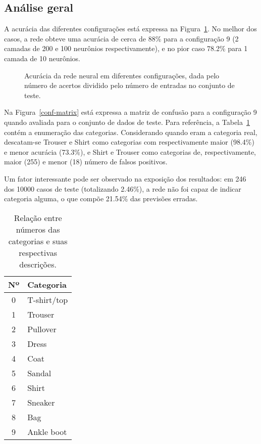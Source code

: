 \documentclass[twocolumn]{article}
\begin{document}
    \subsection{Análise geral}

    A acurácia das diferentes configurações está expressa na
    Figura~\ref{accuracy}. No melhor dos casos, a rede obteve uma acurácia de
    cerca de 88\% para a configuração 9 (2 camadas de 200 e 100 neurônios
    respectivamente), e no pior caso 78.2\% para 1 camada de 10 neurônios.

    \begin{figure}[ht]
        \centering{}
        \def\svgwidth{\columnwidth}
        
        \caption{%
            Acurácia da rede neural em diferentes configurações, dada pelo
            número de acertos dividido pelo número de entradas no conjunto de
            teste.\label{accuracy}
        }
    \end{figure}

    Na Figura~\ref{conf-matrix} está expressa a matriz de confusão para a
    configuração 9 quando avaliada para o conjunto de dados de teste. Para
    referência, a Tabela~\ref{label-nums} contém a enumeração das categorias.
    Considerando quando eram a categoria real, descatam-se Trouser e Shirt como
    categorias com respectivamente maior (98.4\%) e menor acurácia (73.3\%), e
    Shirt e Trouser como categorias de, respectivamente, maior (255) e menor
    (18) número de falsos positivos.

    Um fator interessante pode ser observado na exposição dos resultados: em
    246 dos 10000 casos de teste (totalizando 2.46\%), a rede não foi capaz de
    indicar categoria alguma, o que compõe 21.54\% das previsões erradas.

    \begin{table}[ht]
        \centering
        \begin{tabular}{c l}
            \toprule
            Nº & Categoria \\
            \midrule
            0 & T-shirt/top \\
            1 & Trouser \\
            2 & Pullover \\
            3 & Dress \\
            4 & Coat \\
            5 & Sandal \\
            6 & Shirt \\
            7 & Sneaker \\
            8 & Bag \\
            9 & Ankle boot \\
            \bottomrule
        \end{tabular}
        \caption{%
            Relação entre números das categorias e suas respectivas
            descrições.\label{label-nums}
        }
    \end{table}
\end{document}
